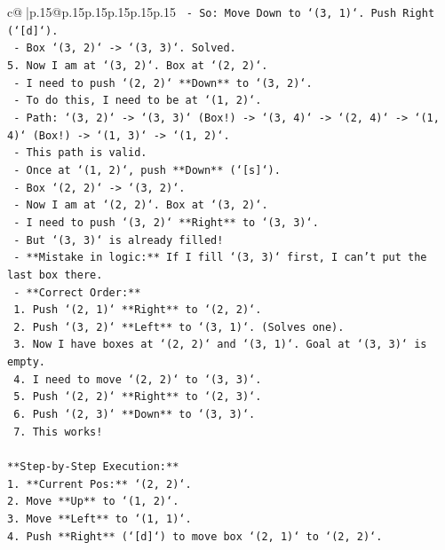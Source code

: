 \documentclass{article}
\begin{document}
{\begin{supertabular}{c@{$\;$}|p{.15\linewidth}@{}p{.15\linewidth}p{.15\linewidth}p{.15\linewidth}p{.15\linewidth}p{.15\linewidth}}
{{{\texttt{    {-}   So: Move Down to `(3, 1)`. Push Right (`{[}d{]}`).} \\
\texttt{    {-}   Box `(3, 2)` {-}> `(3, 3)`. Solved.} \\
\texttt{5.  Now I am at `(3, 2)`. Box at `(2, 2)`.} \\
\texttt{    {-}   I need to push `(2, 2)` **Down** to `(3, 2)`.} \\
\texttt{    {-}   To do this, I need to be at `(1, 2)`.} \\
\texttt{    {-}   Path: `(3, 2)` {-}> `(3, 3)` (Box!) {-}> `(3, 4)` {-}> `(2, 4)` {-}> `(1, 4)` (Box!) {-}> `(1, 3)` {-}> `(1, 2)`.} \\
\texttt{    {-}   This path is valid.} \\
\texttt{    {-}   Once at `(1, 2)`, push **Down** (`{[}s{]}`).} \\
\texttt{    {-}   Box `(2, 2)` {-}> `(3, 2)`.} \\
\texttt{    {-}   Now I am at `(2, 2)`. Box at `(3, 2)`.} \\
\texttt{    {-}   I need to push `(3, 2)` **Right** to `(3, 3)`.} \\
\texttt{    {-}   But `(3, 3)` is already filled!} \\
\texttt{    {-}   **Mistake in logic:** If I fill `(3, 3)` first, I can't put the last box there.} \\
\texttt{    {-}   **Correct Order:**} \\
\texttt{        1.  Push `(2, 1)` **Right** to `(2, 2)`.} \\
\texttt{        2.  Push `(3, 2)` **Left** to `(3, 1)`. (Solves one).} \\
\texttt{        3.  Now I have boxes at `(2, 2)` and `(3, 1)`. Goal at `(3, 3)` is empty.} \\
\texttt{        4.  I need to move `(2, 2)` to `(3, 3)`.} \\
\texttt{        5.  Push `(2, 2)` **Right** to `(2, 3)`.} \\
\texttt{        6.  Push `(2, 3)` **Down** to `(3, 3)`.} \\
\texttt{        7.  This works!} \\
\\ 
\texttt{**Step{-}by{-}Step Execution:**} \\
\texttt{1.  **Current Pos:** `(2, 2)`.} \\
\texttt{2.  Move **Up** to `(1, 2)`.} \\
\texttt{3.  Move **Left** to `(1, 1)`.} \\
\texttt{4.  Push **Right** (`{[}d{]}`) to move box `(2, 1)` to `(2, 2)`.} \\
}}}
\end{supertabular}}
\end{document}
